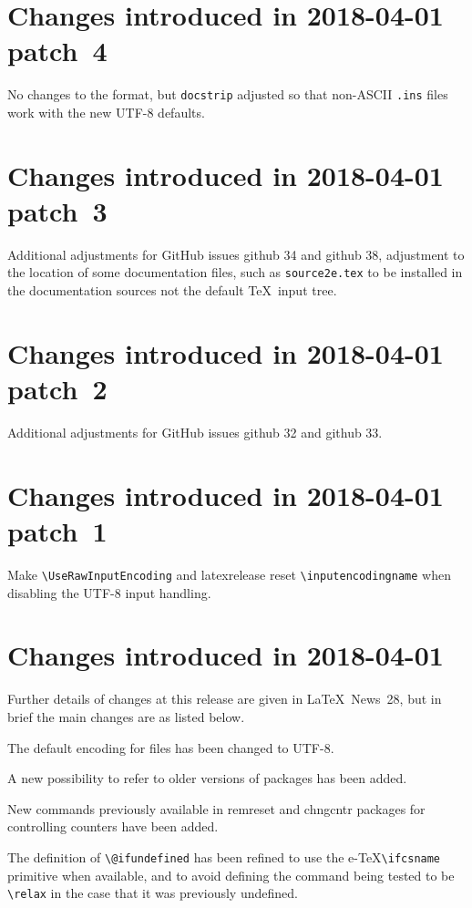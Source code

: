 \documentclass{ltxguide}
\newcommand\Lpack[1]{\mbox{\textsf{#1}}}
\newcommand\ghissue[1]{github #1}
\newcommand\ltnewsissue[1]{\LaTeX\ News~#1}
\newcommand\ghissue[1]{%
    \href{https://github.com/latex3/latex2e/issues/#1}{github #1}}
\newcommand\ltnewsissue[1]{%
    \href{https://www.latex-project.org/news/latex2e-news/ltnews#1.pdf}{\LaTeX\ News~#1}}
\begin{document}
\section{Changes  introduced in 2018-04-01 patch~4}
No changes to the format, but \texttt{docstrip} adjusted so that non-ASCII
\texttt{.ins} files work with the new UTF-8 defaults.

\section{Changes  introduced in 2018-04-01 patch~3}
Additional adjustments for GitHub issues \ghissue{34} and \ghissue{38}, adjustment to the
location of some documentation files, such as \texttt{source2e.tex} to
be installed in the documentation sources not the default \TeX\ input
tree.


\section{Changes  introduced in 2018-04-01 patch~2}
Additional adjustments for GitHub issues  \ghissue{32} and  \ghissue{33}.

\section{Changes  introduced in 2018-04-01 patch~1}
Make \verb|\UseRawInputEncoding| and \Lpack{latexrelease} reset \verb|\inputencodingname|
when disabling the UTF-8 input handling.

\section{Changes  introduced in 2018-04-01}
Further details of changes at this release are given in \ltnewsissue{28}, but in brief
the main changes are as listed below.

The default encoding for files has been changed to UTF-8.

A new possibility to refer to older versions of packages has been added.

New commands previously available in \Lpack{remreset} and
\Lpack{chngcntr} packages for controlling counters have been added.

The definition of \verb|\@ifundefined| has been refined to use the e-\TeX \verb|\ifcsname|
primitive when available, and to avoid defining the command being tested to be \verb|\relax|
in the case that it was previously undefined.
\end{document}
